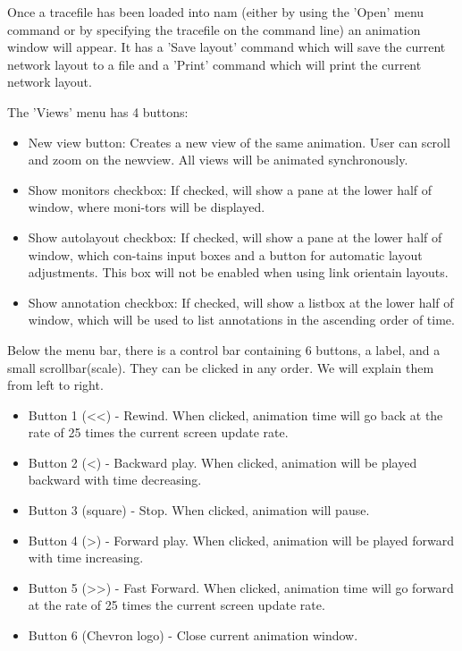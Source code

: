 Once a tracefile has been loaded into nam (either by using the 'Open' menu command or by specifying the tracefile on the command line) an animation window will appear.  It has a 'Save layout' command which will save the current network layout to a file and a 'Print' command which will print the current network layout.

The 'Views' menu has 4 buttons:
\begin{itemize}
\item New view button: Creates a new view of the same animation. User can scroll and zoom on the newview. All views will be animated synchronously.
\item  Show monitors checkbox: If checked, will show a pane at the lower half of window, where moni-tors will be displayed.
\item  Show autolayout checkbox: If checked, will show a pane at the lower half of window, which con-tains input boxes and a button for automatic layout adjustments. This box will not be enabled when using link orientain layouts.
\item Show annotation checkbox: If checked, will show a listbox at the lower half of window, which will be used to list annotations in the ascending order of time.
\end{itemize}

Below the  menu  bar, there  is  a control  bar containing  6  buttons,  a  label,  and  a  small  scrollbar(scale). They can be clicked in any order. We will explain them from left to right.

\begin{itemize}
\item Button 1 (<<) - Rewind. When clicked, animation time will go back at the rate of 25  times the current screen update rate.
\item  Button 2 (<) - Backward play. When clicked, animation will be played backward with time decreasing.
\item Button 3 (square) - Stop. When clicked, animation will pause.
\item Button 4 (>)  - Forward play. When clicked, animation will be played forward with time increasing.
\item Button 5 (>>) - Fast  Forward.  When  clicked,  animation  time  will  go  forward  at  the  rate  of  25  times  the  current screen update rate.
\item Button 6 (Chevron logo) - Close current animation window.
\end{itemize}

